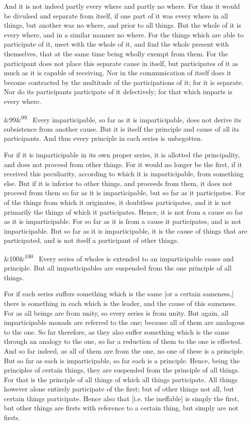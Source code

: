 \documentclass[12pt]{article}
\newcommand{\para}[1][]{\par\noindent\ifx&#1&\else\textsuperscript{\footnotesize #1}~\fi}
\begin{document}
And it is not indeed partly every where and partly no where. For thus it would be divulsed and separate from itself, if one part of it was every where in all things, but another was no where, and prior to all things. But the whole of it is every where, and in a similar manner no where. For the things which are able to participate of it, meet with the whole of it, and find the whole present with themselves, that at the same time being wholly exempt from them. For the participant does not place this separate cause in itself, but participates of it as much as it is capable of receiving. Nor in the communication of itself does it become contracted by the multitude of the participations of it; for it is separate. Nor do its participants participate of it defectively; for that which imparts is every where.

\para[99] Every imparticipable, so far as it is imparticipable, does not derive its subsistence from another cause. But it is itself the principle and cause of all its participants. And thus every principle in each series is unbegotten.

For if it is imparticipable in its own proper series, it is allotted the principality, and does not proceed from other things. For it would no longer be the first, if it received this peculiarity, according to which it is imparticipable, from something else. But if it is inferior to other things, and proceeds from them, it does not proceed from them so far as it is imparticipable, but so far as it participates. For of the things from which it originates, it doubtless participates, and it is not primarily the things of which it participates. Hence, it is not from a cause so far as it is imparticipable. For so far as it is from a cause it participates, and is not imparticipable. But so far as it is imparticipable, it is the cause of things that are participated, and is not itself a participant of other things.

\para[100] Every series of wholes is extended to an imparticipable cause and principle. But all imparticipables are suspended from the one principle of all things.

For if each series suffers something which is the same [or a certain sameness,] there is something in each which is the leader, and the cause of this sameness. For as all beings are from unity, so every series is from unity. But again, all imparticipable monads are referred to the one; because all of them are analogous to the one. So far therefore, as they also suffer something which is the same through an analogy to the one, so far a reduction of them to the one is effected. And so far indeed, as all of them are from the one, no one of these is a principle. But so far as each is imparticipable, so far each is a principle. Hence, being the principles of certain things, they are suspended from the principle of all things. For that is the principle of all things of which all things participate. All things however alone entirely participate of the first; but of other things not all, but certain things participate. Hence also that [i.e. the ineffable] is simply the first, but other things are firsts with reference to a certain thing, but simply are not firsts.
\end{document}
